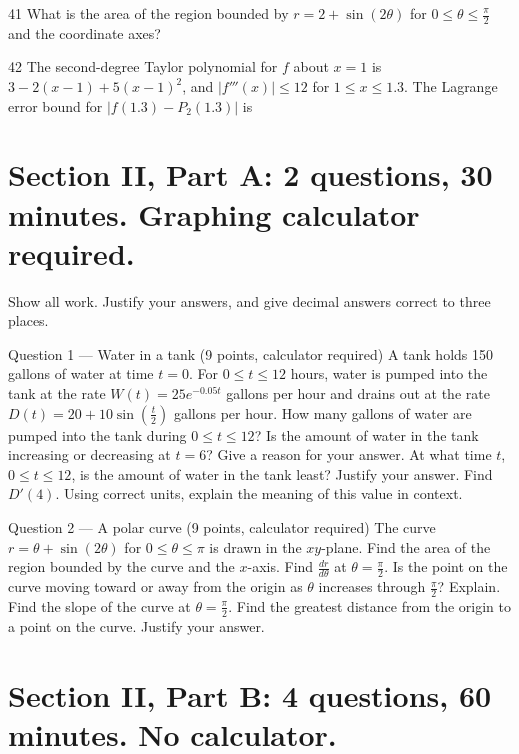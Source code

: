 \documentclass{apcalc}
\begin{document}
\begin{q}{41}
What is the area of the region bounded by $r=2+\sin(2\theta)$ for $0\le\theta\le\frac\pi2$ and the coordinate axes?
\end{q}
\begin{q}{42}
The second-degree Taylor polynomial for $f$ about $x=1$ is $3-2(x-1)+5(x-1)^2$, and $|f'''(x)|\le12$ for $1\le x\le1.3$. The Lagrange error bound for $|f(1.3)-P_2(1.3)|$ is
\end{q}
\clearpage\section*{Section II, Part A: 2 questions, 30 minutes. Graphing calculator required.}
Show all work. Justify your answers, and give decimal answers correct to three places.
\begin{frq}{Question 1 --- Water in a tank (9 points, calculator required)}
A tank holds 150 gallons of water at time $t=0$. For $0\le t\le12$ hours, water is pumped into the tank at the rate $W(t)=25e^{-0.05t}$ gallons per hour and drains out at the rate $D(t)=20+10\sin\left(\frac t2\right)$ gallons per hour.
How many gallons of water are pumped into the tank during $0\le t\le12$?\workspace{1.6in}
Is the amount of water in the tank increasing or decreasing at $t=6$? Give a reason for your answer.\workspace{1.6in}
At what time $t$, $0\le t\le12$, is the amount of water in the tank least? Justify your answer.\workspace{1.6in}
Find $D'(4)$. Using correct units, explain the meaning of this value in context.\workspace{1.6in}
\end{frq}
\begin{frq}{Question 2 --- A polar curve (9 points, calculator required)}
The curve $r=\theta+\sin(2\theta)$ for $0\le\theta\le\pi$ is drawn in the $xy$-plane.
Find the area of the region bounded by the curve and the $x$-axis.\workspace{1.6in}
Find $\frac{dr}{d\theta}$ at $\theta=\frac\pi2$. Is the point on the curve moving toward or away from the origin as $\theta$ increases through $\frac\pi2$? Explain.\workspace{1.6in}
Find the slope of the curve at $\theta=\frac\pi2$.\workspace{1.6in}
Find the greatest distance from the origin to a point on the curve. Justify your answer.\workspace{1.6in}
\end{frq}
\clearpage\section*{Section II, Part B: 4 questions, 60 minutes. No calculator.}
\end{document}
